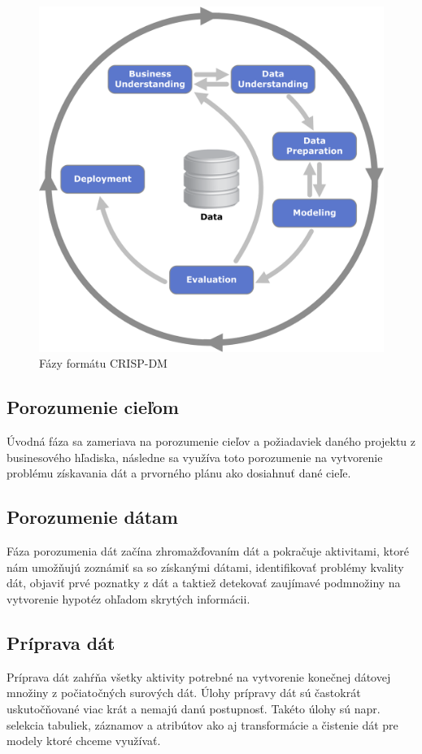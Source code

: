 \begin{figure}[H]
	\begin{center}
		\includegraphics[scale=0.6]{img/crisp-dm.png}
		\caption{Fázy formátu CRISP-DM}
		\label{img:crisp-dm}
	\end{center}
\end{figure}
\subsection{Porozumenie cieľom}
Úvodná fáza sa zameriava na porozumenie cieľov a požiadaviek daného projektu z businesového hľadiska, následne sa využíva toto porozumenie na vytvorenie problému získavania dát a prvorného plánu ako dosiahnuť dané cieľe.
\subsection{Porozumenie dátam}
Fáza porozumenia dát začína zhromažďovaním dát a pokračuje aktivitami, ktoré nám umožňujú zoznámiť sa so získanými dátami, identifikovať problémy kvality dát, objaviť prvé poznatky z dát a taktiež detekovať zaujímavé podmnožiny na vytvorenie hypotéz ohľadom skrytých informácii.
\subsection{Príprava dát}
Príprava dát zahŕňa všetky aktivity potrebné na vytvorenie konečnej dátovej množiny z počiatočných surových dát. Úlohy prípravy dát sú častokrát uskutočňované viac krát a nemajú danú postupnosť. Takéto úlohy sú napr. selekcia tabuliek, záznamov a atribútov ako aj transformácie a čistenie dát pre modely ktoré chceme využívať. 
